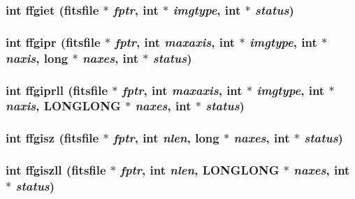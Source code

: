 \subsubsection{\setlength{\rightskip}{0pt plus 5cm}int ffgiet (\bf{fitsfile} $\ast$ {\em fptr}, int $\ast$ {\em imgtype}, int $\ast$ {\em status})}\label{test_2shm__client_2fitsio_8h_d26898d66d9521c703b32f967a7ec68c}


\subsubsection{\setlength{\rightskip}{0pt plus 5cm}int ffgipr (\bf{fitsfile} $\ast$ {\em fptr}, int {\em maxaxis}, int $\ast$ {\em imgtype}, int $\ast$ {\em naxis}, long $\ast$ {\em naxes}, int $\ast$ {\em status})}\label{test_2shm__client_2fitsio_8h_36cf874c199041ee45957859c011adc4}


\subsubsection{\setlength{\rightskip}{0pt plus 5cm}int ffgiprll (\bf{fitsfile} $\ast$ {\em fptr}, int {\em maxaxis}, int $\ast$ {\em imgtype}, int $\ast$ {\em naxis}, \bf{LONGLONG} $\ast$ {\em naxes}, int $\ast$ {\em status})}\label{test_2shm__client_2fitsio_8h_bf531fec534d692d887dc85d0c415611}


\subsubsection{\setlength{\rightskip}{0pt plus 5cm}int ffgisz (\bf{fitsfile} $\ast$ {\em fptr}, int {\em nlen}, long $\ast$ {\em naxes}, int $\ast$ {\em status})}\label{test_2shm__client_2fitsio_8h_8d84fada6d2b3d4c9e4153716437728c}


\subsubsection{\setlength{\rightskip}{0pt plus 5cm}int ffgiszll (\bf{fitsfile} $\ast$ {\em fptr}, int {\em nlen}, \bf{LONGLONG} $\ast$ {\em naxes}, int $\ast$ {\em status})}\label{test_2shm__client_2fitsio_8h_9f3109f783dd55f01dd7e8130e9c355a}


